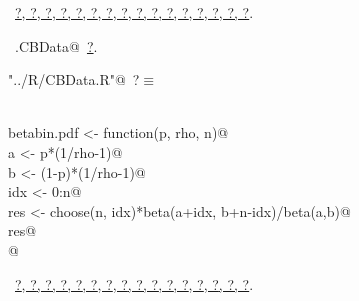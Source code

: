 \documentclass[reqno]{amsart}
\renewcommand{\NWtarget}[2]{\hypertarget{#1}{#2}}
\renewcommand{\NWlink}[2]{\hyperlink{#1}{#2}}
\begin{document}
\begin{flushleft}
\begin{minipage}{\linewidth}
\begin{list}{}{}
\mbox{}\verb@@{\NWsep}
\end{list}
\vspace{-1.5ex}
\footnotesize
\begin{list}{}{\setlength{\itemsep}{-\parsep}\setlength{\itemindent}{-\leftmargin}}
\item \NWtxtFileDefBy\ \NWlink{nuweb?}{?}\NWlink{nuweb?}{, ?}\NWlink{nuweb?}{, ?}\NWlink{nuweb?}{, ?}\NWlink{nuweb?}{, ?}\NWlink{nuweb?}{, ?}\NWlink{nuweb?}{, ?}\NWlink{nuweb?}{, ?}\NWlink{nuweb?}{, ?}\NWlink{nuweb?}{, ?}\NWlink{nuweb?}{, ?}\NWlink{nuweb?}{, ?}\NWlink{nuweb?}{, ?}\NWlink{nuweb?}{, ?}\NWlink{nuweb?}{, ?}\NWlink{nuweb?}{, ?}.
\item \NWtxtIdentsUsed\nobreak\  \verb@ran.CBData@\nobreak\ \NWlink{nuweb?}{?}.
\item{}
\end{list}
\end{minipage}\vspace{4ex}
\end{flushleft}
\begin{flushleft} \small\label{scrap17}\raggedright\small
\NWtarget{nuweb?}{} \verb@"../R/CBData.R"@\nobreak\ {\footnotesize {?}}$\equiv$
\vspace{-1ex}
\begin{list}{}{} \item
\mbox{}\verb@@\\
\mbox{}\verb@ betabin.pdf <- function(p, rho, n){@\\
\mbox{}\verb@   a <- p*(1/rho-1)@\\
\mbox{}\verb@   b <- (1-p)*(1/rho-1)@\\
\mbox{}\verb@   idx <- 0:n@\\
\mbox{}\verb@   res <- choose(n, idx)*beta(a+idx, b+n-idx)/beta(a,b)@\\
\mbox{}\verb@   res@\\
\mbox{}\verb@  } @\\
\mbox{}\verb@@{\NWsep}
\end{list}
\vspace{-1.5ex}
\footnotesize
\begin{list}{}{\setlength{\itemsep}{-\parsep}\setlength{\itemindent}{-\leftmargin}}
\item \NWtxtFileDefBy\ \NWlink{nuweb?}{?}\NWlink{nuweb?}{, ?}\NWlink{nuweb?}{, ?}\NWlink{nuweb?}{, ?}\NWlink{nuweb?}{, ?}\NWlink{nuweb?}{, ?}\NWlink{nuweb?}{, ?}\NWlink{nuweb?}{, ?}\NWlink{nuweb?}{, ?}\NWlink{nuweb?}{, ?}\NWlink{nuweb?}{, ?}\NWlink{nuweb?}{, ?}\NWlink{nuweb?}{, ?}\NWlink{nuweb?}{, ?}\NWlink{nuweb?}{, ?}\NWlink{nuweb?}{, ?}.

\item{}
\end{list}
\vspace{4ex}
\end{flushleft}
\end{document}
